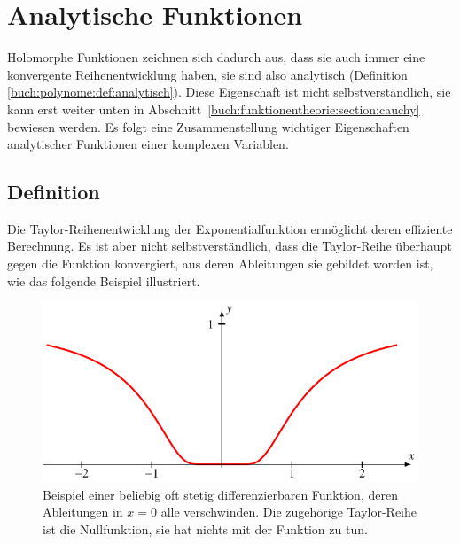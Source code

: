 %
%
%
\section{Analytische Funktionen
\label{buch:funktionentheorie:section:analytisch}}
Holomorphe Funktionen zeichnen sich dadurch aus, dass sie auch immer
eine konvergente Reihenentwicklung haben, sie sind also analytisch
(Definition \ref{buch:polynome:def:analytisch}).
%
Diese Eigenschaft ist nicht selbstverständlich, sie kann erst
weiter unten in Abschnitt~\ref{buch:funktionentheorie:section:cauchy}
bewiesen werden.
Es folgt eine Zusammenstellung wichtiger Eigenschaften analytischer
Funktionen einer komplexen Variablen.

%
%
\subsection{Definition}
%
%
Die Taylor-Reihenentwicklung der Exponentialfunktion ermöglicht deren
effiziente Berechnung.
Es ist aber nicht selbstverständlich, dass die Taylor-Reihe überhaupt
gegen die Funktion konvergiert, aus deren Ableitungen sie gebildet
worden ist, wie das folgende Beispiel illustriert.

\begin{figure}
\centering
\includegraphics{chapters/080-funktionentheorie/images/nonanalytic.pdf}
\caption{Beispiel einer beliebig oft stetig differenzierbaren Funktion,
deren Ableitungen in $x=0$ alle verschwinden.
Die zugehörige Taylor-Reihe ist die Nullfunktion, sie hat nichts mit der
Funktion zu tun.
\label{buch:funktionentheorie:fig:nonanalytic}}
\end{figure}

